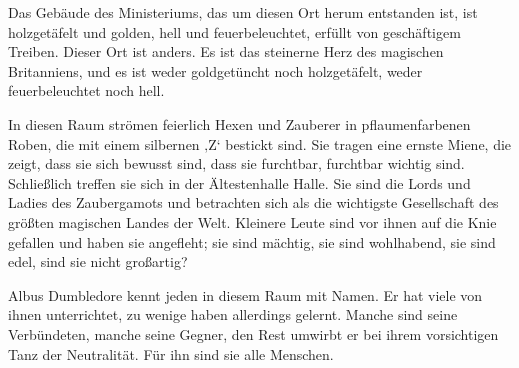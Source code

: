 Das Gebäude des Ministeriums, das um diesen Ort herum entstanden ist, ist holzgetäfelt und golden, hell und feuerbeleuchtet, erfüllt von geschäftigem Treiben. Dieser Ort ist anders. Es ist das steinerne Herz des magischen Britanniens, und es ist weder goldgetüncht noch holzgetäfelt, weder feuerbeleuchtet noch hell.

In diesen Raum strömen feierlich Hexen und Zauberer in pflaumenfarbenen Roben, die mit einem silbernen ‚Z‘ bestickt sind. Sie tragen eine ernste Miene, die zeigt, dass sie sich bewusst sind, dass sie furchtbar, furchtbar wichtig sind. Schließlich treffen sie sich in der Ältestenhalle Halle. Sie sind die Lords und Ladies des Zaubergamots und betrachten sich als die wichtigste Gesellschaft des größten magischen Landes der Welt. Kleinere Leute sind vor ihnen auf die Knie gefallen und haben sie angefleht; sie sind mächtig, sie sind wohlhabend, sie sind edel, sind sie nicht großartig?

Albus Dumbledore kennt jeden in diesem Raum mit Namen. Er hat viele von ihnen unterrichtet, zu wenige haben allerdings gelernt. Manche sind seine Verbündeten, manche seine Gegner, den Rest umwirbt er bei ihrem vorsichtigen Tanz der Neutralität. Für ihn sind sie alle Menschen.

